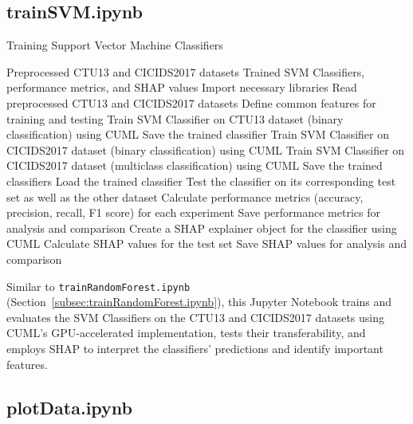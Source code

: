 \subsection{trainSVM.ipynb}\label{subsec:trainSVM.ipynb}

\begin{algorithm}[H]
\caption{Training Support Vector Machine Classifiers}\label{alg:trainSVM} 
\begin{algorithmic}[1]
\Require%
Preprocessed CTU13 and CICIDS2017 datasets
\Ensure%
Trained SVM Classifiers, performance metrics, and SHAP values  
\State%
Import necessary libraries
\State%
Read preprocessed CTU13 and CICIDS2017 datasets
\State%
Define common features for training and testing
        \State%
        Train SVM Classifier on CTU13 dataset (binary classification) using CUML
        \State%
        Save the trained classifier
        \State%
        Train SVM Classifier on CICIDS2017 dataset (binary classification) using CUML
        \State%
        Train SVM Classifier on CICIDS2017 dataset (multiclass classification) using CUML
        \State%
        Save the trained classifiers
    \EndIf%
\EndFor%
    \State%
    Load the trained classifier
    \State%
    Test the classifier on its corresponding test set as well as the other dataset
    \State%
    Calculate performance metrics (accuracy, precision, recall, F1 score) for each experiment
    \State%
    Save performance metrics for analysis and comparison
    \State%
    Create a SHAP explainer object for the classifier using CUML
    \State%
    Calculate SHAP values for the test set
    \State%
    Save SHAP values for analysis and comparison
\EndFor%
\end{algorithmic}
\end{algorithm}

Similar to \texttt{trainRandomForest.ipynb} (Section~\ref{subsec:trainRandomForest.ipynb}), this Jupyter Notebook trains and evaluates the SVM Classifiers on the CTU13 and CICIDS2017 datasets using CUML's GPU-accelerated implementation, tests their transferability, and employs SHAP to interpret the classifiers' predictions and identify important features.

\subsection{plotData.ipynb}\label{subsec:plotData.ipynb}

